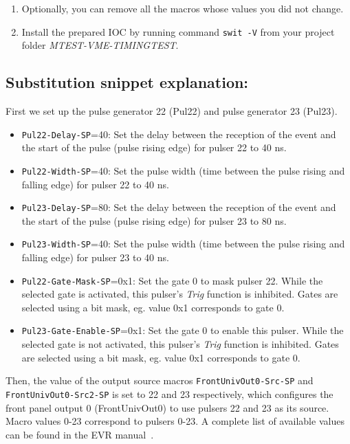\documentclass[12pt,a4paper]{article}
\begin{document}
\begin{enumerate}
	\item Optionally, you can remove all the macros whose values you did not change. 
	\item Install the prepared IOC by running command \texttt{swit -V} from your project folder \textit{MTEST-VME-TIMINGTEST}.
\end{enumerate}

\subsection{Substitution snippet explanation:}\label{sec:explain_triggerSwitching}

First we set up the pulse generator 22 (Pul22) and  pulse generator 23 (Pul23).
\begin{itemize}
	\item \texttt{Pul22-Delay-SP}=40: Set the delay between the reception of the event and the start of the pulse (pulse rising edge) for pulser 22 to 40 ns. 
	\item \texttt{Pul22-Width-SP}=40: Set the pulse width (time between the pulse rising and falling edge) for pulser 22 to 40 ns.
	\item \texttt{Pul23-Delay-SP}=80: Set the delay between the reception of the event and the start of the pulse (pulse rising edge) for pulser 23 to 80 ns. 
	\item \texttt{Pul23-Width-SP}=40: Set the pulse width (time between the pulse rising and falling edge) for pulser 23 to 40 ns.
	\item \texttt{Pul22-Gate-Mask-SP}=0x1: Set the gate 0 to mask pulser 22. While the selected gate is activated, this pulser's \textit{Trig} function is inhibited. Gates are selected using a bit mask, eg. value 0x1 corresponds to gate 0.
	\item \texttt{Pul23-Gate-Enable-SP}=0x1: Set the gate 0 to enable this pulser. While the selected gate is not activated, this pulser's \textit{Trig} function is inhibited. Gates are selected using a bit mask, eg. value 0x1 corresponds to gate 0.
\end{itemize}

Then, the value of the output source macros \texttt{FrontUnivOut0-Src-SP} and \texttt{FrontUnivOut0-Src2-SP} is set to 22 and 23 respectively, which configures the front panel output 0 (FrontUnivOut0) to use pulsers 22 and 23 as its source. Macro values 0-23 correspond to pulsers 0-23. A complete list of available values can be found in the EVR manual~\cite{evr_manual}.
\end{document}
